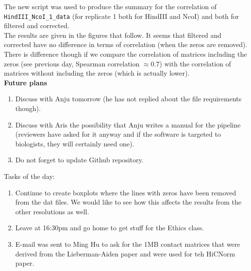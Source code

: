 \documentclass[idxtotoc,hyperref,openany]{labbook} %
\begin{document}
The new script was used to produce the summary for the correlation of \texttt{HindIII\_NcoI\_1\_data} (for replicate 1 both for HindIII and NcoI) and both for filtered and corrected.\\

	

The results are given in the figures that follow. It seems that filtered and corrected have no difference in terms of correlation (when the zeros are removed). There is difference though if we compare the correlation of matrices including the zeros (see previous day, Spearman correlation $\approx 0.7$) with the correlation of matrices without including the zeros (which is actually lower).\\ 

\textbf{Future plans}

\begin{enumerate}
	\item Discuss with Anju tomorrow (he has not replied about the file requirements though).
	\item Discuss with Aris the possibility that Anju writes a manual for 
	the pipeline (reviewers have asked for it anyway and if the software
	is targeted to biologists, they will certainly need one).
	\item Do not forget to update Github repository. 
\end{enumerate}




Tasks of the day:

\begin{enumerate}
	\item Continue to create boxplots where the lines with zeros have been removed from the dat files. We would like to see how this affects the results from the other resolutions as well.
	\item Leave at 16:30pm and go home to get stuff for the Ethics class.
	\item E-mail was sent to Ming Hu to ask for the 1MB contact matrices that were derived from the Lieberman-Aiden paper and were used for teh HiCNorm paper.
\end{enumerate}
\end{document}
